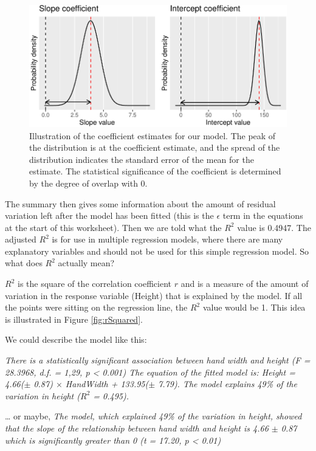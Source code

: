 \documentclass[
  a4paperpaper,
]{book}
\begin{document}
\begin{figure}[ht]

{\centering \includegraphics{BB852_files/figure-latex/coefPlot-1} 

}

\caption{Illustration of the coefficient estimates for our model. The peak of the distribution is at the coefficient estimate, and the spread of the distribution indicates the standard error of the mean for the estimate. The statistical significance of the coefficient is determined by the degree of overlap with 0.}\label{fig:coefPlot}
\end{figure}

The summary then gives some information about the amount of residual variation left after the model has been fitted (this is the \(\epsilon\) term in the equations at the start of this worksheet). Then we are told what the \(R^2\) value is 0.4947. The adjusted \(R^2\) is for use in multiple regression models, where there are many explanatory variables and should not be used for this simple regression model. So what does \(R^2\) actually mean?

\(R^2\) is the square of the correlation coefficient \(r\) and is a measure of the amount of variation in the response variable (Height) that is explained by the model. If all the points were sitting on the regression line, the \(R^2\) value would be 1. This idea is illustrated in Figure \ref{fig:rSquared}.

We could describe the model like this:

\emph{There is a statistically significant association between hand width and height (F = 28.3968, d.f. = 1,29, p \textless{} 0.001) The equation of the fitted model is: Height = 4.66(\(\pm\) 0.87) \(\times\) HandWidth + 133.95(\(\pm\) 7.79). The model explains 49\% of the variation in height (\(R^2\) = 0.495).}

\ldots{} or maybe, \emph{The model, which explained 49\% of the variation in height, showed that the slope of the relationship between hand width and height is 4.66 \(\pm\) 0.87 which is significantly greater than 0 (t = 17.20, p \textless{} 0.01)}
\end{document}
